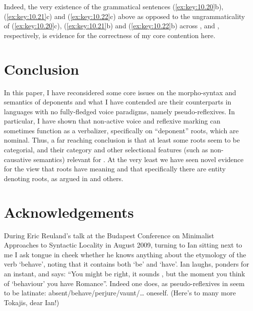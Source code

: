 \documentclass[output=paper]{langsci/langscibook}
\begin{document}
Indeed, the very existence of the grammatical sentences (\ref{ex:key:10.20}b),
(\ref{ex:key:10.21}c) and (\ref{ex:key:10.22}c) above as opposed to the
ungrammaticality of (\ref{ex:key:10.20}c), (\ref{ex:key:10.21}b) and
(\ref{ex:key:10.22}b) across ,  and , respectively, is
evidence for the correctness of my core contention here.

\section{Conclusion}\label{sec:key:10.5}

In this paper, I have reconsidered some core issues on the morpho-syntax and
semantics of deponents and what I have contended are their counterparts in
languages with no fully-fledged voice paradigms, namely pseudo-reflexives. In
particular, I have shown that non-active voice and reflexive marking can
sometimes function as a verbalizer, specifically on \enquote{deponent} roots,
which are nominal. Thus, a far reaching conclusion is that at least some roots
seem to be categorial, and their category and other selectional features (such
as non-causative semantics) relevant for . At the very least we have
seen novel evidence for the view that roots have meaning and that specifically
there are entity denoting roots, as argued in \citet{Harley2005,Levinson2007}
and others.

\printchapterglossary{}

\section*{Acknowledgements}

During Eric Reuland’s talk at the Budapest Conference on Minimalist Approaches
to Syntactic Locality in August 2009, turning to Ian sitting next to me I ask
tongue in cheek whether he knows anything about the etymology of the verb
‘behave’, noting that it contains both ‘be’ and ‘have’. Ian laughs, ponders for
an instant, and says: “You might be right, it sounds , but the moment
you think of ‘behaviour’ you have Romance”. Indeed one does, as
pseudo-reflexives in  seem to be latinate:
absent/behave/perjure/vaunt/\dots{} oneself. (Here’s to many more Tokajis, dear
Ian!)

{\sloppy
\printbibliography[heading=subbibliography,notkeyword=this]
}
\end{document}
